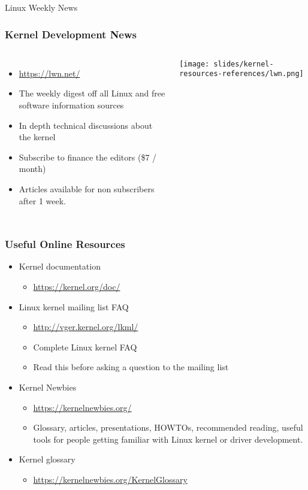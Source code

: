 \begin{frame}
  Linux Weekly News
  \frametitle{Kernel Development News}
  \begin{columns}
    \begin{itemize}
    \item \url{https://lwn.net/}
    \item The weekly digest off all Linux and free software
      information sources
    \item In depth technical discussions about the kernel
    \item Subscribe to finance the editors (\$7 / month)
    \item Articles available for non subscribers after 1 week.
    \end{itemize}
    \texttt{[image: slides/kernel-resources-references/lwn.png]}
  \end{columns}
\end{frame}

\begin{frame}
  \frametitle{Useful Online Resources}
  \begin{itemize}
  \item Kernel documentation
    \begin{itemize}
    \item \url{https://kernel.org/doc/}
    \end{itemize}
  \item Linux kernel mailing list FAQ
    \begin{itemize}
    \item \url{http://vger.kernel.org/lkml/}
    \item Complete Linux kernel FAQ
    \item Read this before asking a question to the mailing list
    \end{itemize}
  \item Kernel Newbies
    \begin{itemize}
    \item \url{https://kernelnewbies.org/}
    \item Glossary, articles, presentations, HOWTOs, recommended
      reading, useful tools for people getting familiar with Linux
      kernel or driver development.
    \end{itemize}
  \item Kernel glossary
    \begin{itemize}
    \item \url{https://kernelnewbies.org/KernelGlossary}
    \end{itemize}
\end{itemize}

\end{frame}

